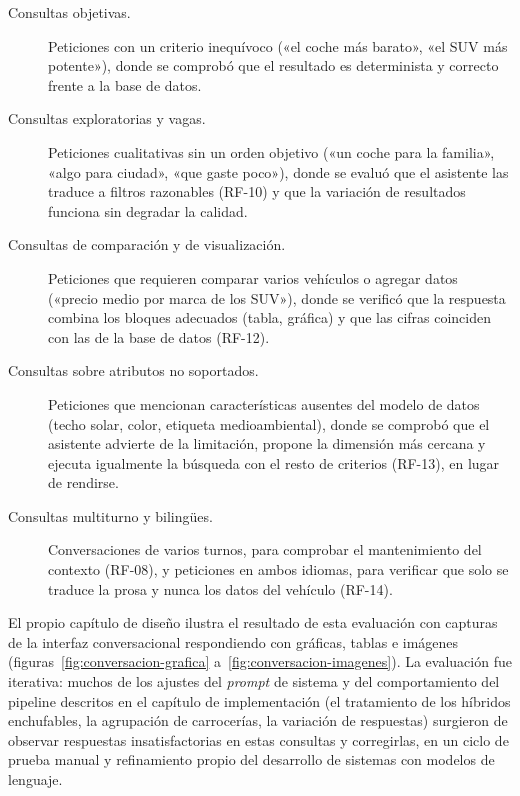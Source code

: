\begin{description}
  \item[Consultas objetivas.] Peticiones con un criterio inequívoco («el coche
        más barato», «el SUV más potente»), donde se comprobó que el resultado es
        determinista y correcto frente a la base de datos.

  \item[Consultas exploratorias y vagas.] Peticiones cualitativas sin un orden
        objetivo («un coche para la familia», «algo para ciudad», «que gaste
        poco»), donde se evaluó que el asistente las traduce a filtros razonables
        (RF-10) y que la variación de resultados funciona sin degradar la
        calidad.

  \item[Consultas de comparación y de visualización.] Peticiones que requieren
        comparar varios vehículos o agregar datos («precio medio por marca de los
        SUV»), donde se verificó que la respuesta combina los bloques adecuados
        (tabla, gráfica) y que las cifras coinciden con las de la base de datos
        (RF-12).

  \item[Consultas sobre atributos no soportados.] Peticiones que mencionan
        características ausentes del modelo de datos (techo solar, color, etiqueta
        medioambiental), donde se comprobó que el asistente advierte de la
        limitación, propone la dimensión más cercana y ejecuta igualmente la
        búsqueda con el resto de criterios (RF-13), en lugar de rendirse.

  \item[Consultas multiturno y bilingües.] Conversaciones de varios turnos, para
        comprobar el mantenimiento del contexto (RF-08), y peticiones en ambos
        idiomas, para verificar que solo se traduce la prosa y nunca los datos del
        vehículo (RF-14).
\end{description}

El propio capítulo de diseño ilustra el resultado de esta evaluación con capturas
de la interfaz conversacional respondiendo con gráficas, tablas e imágenes
(figuras~\ref{fig:conversacion-grafica} a~\ref{fig:conversacion-imagenes}). La
evaluación fue iterativa: muchos de los ajustes del \emph{prompt} de sistema y
del comportamiento del pipeline descritos en el capítulo de implementación (el
tratamiento de los híbridos enchufables, la agrupación de carrocerías, la
variación de respuestas) surgieron de observar respuestas insatisfactorias en
estas consultas y corregirlas, en un ciclo de prueba manual y refinamiento
propio del desarrollo de sistemas con modelos de lenguaje.

